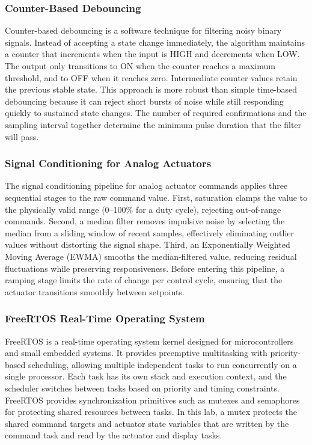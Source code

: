 \subsubsection{Counter-Based Debouncing}

Counter-based debouncing is a software technique for filtering noisy binary signals. Instead of accepting a state change immediately, the algorithm maintains a counter that increments when the input is HIGH and decrements when LOW. The output only transitions to ON when the counter reaches a maximum threshold, and to OFF when it reaches zero. Intermediate counter values retain the previous stable state. This approach is more robust than simple time-based debouncing because it can reject short bursts of noise while still responding quickly to sustained state changes. The number of required confirmations and the sampling interval together determine the minimum pulse duration that the filter will pass.

\subsubsection{Signal Conditioning for Analog Actuators}

The signal conditioning pipeline for analog actuator commands applies three sequential stages to the raw command value. First, saturation clamps the value to the physically valid range (0--100\% for a duty cycle), rejecting out-of-range commands. Second, a median filter removes impulsive noise by selecting the median from a sliding window of recent samples, effectively eliminating outlier values without distorting the signal shape. Third, an Exponentially Weighted Moving Average (EWMA) smooths the median-filtered value, reducing residual fluctuations while preserving responsiveness. Before entering this pipeline, a ramping stage limits the rate of change per control cycle, ensuring that the actuator transitions smoothly between setpoints.

\subsubsection{FreeRTOS Real-Time Operating System}

FreeRTOS is a real-time operating system kernel designed for microcontrollers and small embedded systems. It provides preemptive multitasking with priority-based scheduling, allowing multiple independent tasks to run concurrently on a single processor. Each task has its own stack and execution context, and the scheduler switches between tasks based on priority and timing constraints. FreeRTOS provides synchronization primitives such as mutexes and semaphores for protecting shared resources between tasks. In this lab, a mutex protects the shared command targets and actuator state variables that are written by the command task and read by the actuator and display tasks.

